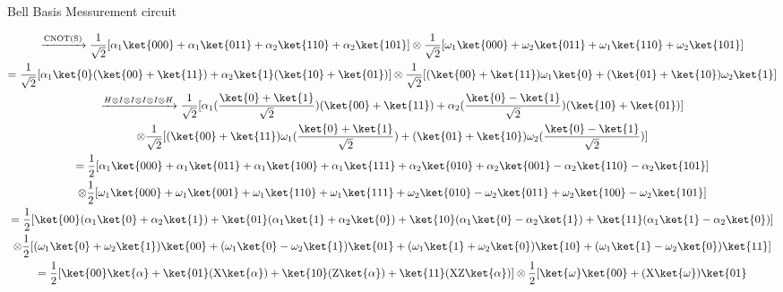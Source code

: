 \documentclass[]{article}
\begin{document}
\begin{enumerate}
        Bell Basis Messurement circuit

        \begin{gather*}
          \xrightarrow{\text{CNOT(S)}}  \frac{1}{\sqrt{2}}[\alpha_1 \ket{000} + \alpha_1 \ket{011} + 
          \alpha_2 \ket{110} + \alpha_2 \ket{101}]
          \otimes \frac{1}{\sqrt{2}}[\omega_1 \ket{000} + \omega_2 \ket{011} + 
          \omega_1 \ket{110} + \omega_2 \ket{101}]\\
          = \frac{1}{\sqrt{2}}[\alpha_1 \ket{0}(\ket{00} + \ket{11}) + \alpha_2 \ket{1}(\ket{10} + \ket{01})]
          \otimes \frac{1}{\sqrt{2}}[(\ket{00} + \ket{11}) \omega_1 \ket{0} + (\ket{01} + \ket{10}) \omega_2 \ket{1}]\\
          \xrightarrow{H \otimes I \otimes I \otimes I \otimes I \otimes H}
          \frac{1}{\sqrt{2}}[\alpha_1 (\frac{\ket{0} + \ket{1}}{\sqrt{2}}) (\ket{00} + \ket{11}) 
          + \alpha_2 (\frac{\ket{0} - \ket{1}}{\sqrt{2}})(\ket{10} + \ket{01})] \\
          \otimes \frac{1}{\sqrt{2}}[(\ket{00} + \ket{11}) \omega_1 (\frac{\ket{0} + \ket{1}}{\sqrt{2}})
          + (\ket{01} + \ket{10}) \omega_2 (\frac{\ket{0} - \ket{1}}{\sqrt{2}})]\\
          = \frac{1}{2} [\alpha_1 \ket{000} + \alpha_1 \ket{011} + \alpha_1 \ket{100} + \alpha_1 \ket{111}
          + \alpha_2 \ket{010} + \alpha_2 \ket{001} - \alpha_2 \ket{110} - \alpha_2 \ket{101}]\\
          \otimes \frac{1}{2}[\omega_1 \ket{000} + \omega_1 \ket{001} + \omega_1 \ket{110} + \omega_1 \ket{111}
          + \omega_2 \ket{010} - \omega_2 \ket{011} + \omega_2 \ket{100} - \omega_2 \ket{101}]\\
          = \frac{1}{2}[\ket{00}(\alpha_1 \ket{0} + \alpha_2 \ket{1}) + \ket{01}(\alpha_1 \ket{1} + \alpha_2 \ket{0})
          + \ket{10}(\alpha_1 \ket{0} - \alpha_2 \ket{1}) + \ket{11}(\alpha_1 \ket{1} - \alpha_2 \ket{0})]\\
          \otimes \frac{1}{2}[(\omega_1 \ket{0} + \omega_2 \ket{1})\ket{00} 
          + (\omega_1 \ket{0} - \omega_2 \ket{1})\ket{01}
          + (\omega_1 \ket{1} + \omega_2 \ket{0})\ket{10} + (\omega_1 \ket{1} - \omega_2 \ket{0})\ket{11}]\\
          = \frac{1}{2}[\ket{00} \ket{\alpha} + \ket{01} (\text{X} \ket{\alpha}) + \ket{10} (\text{Z} \ket{\alpha})
          + \ket{11} (\text{XZ} \ket{\alpha})]
          \otimes \frac{1}{2}[\ket{\omega} \ket{00} + (\text{X} \ket{\omega}) \ket{01}\\

\end{gather*}
\end{enumerate}
\end{document}
